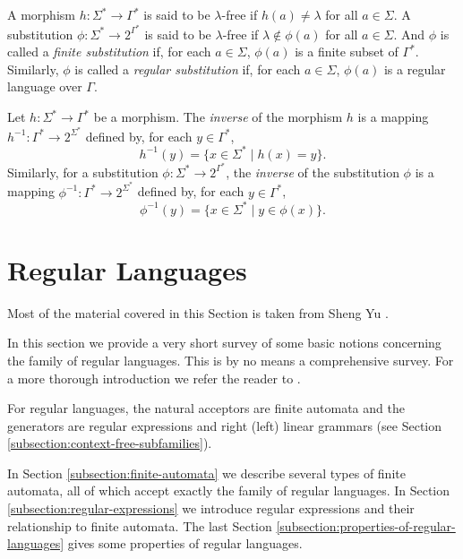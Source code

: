 A morphism $h: \Sigma^* \to \Gamma^*$ is said to be $\lambda$-free if $h(a) \neq \lambda$ for all $a \in \Sigma$. A substitution $\phi: \Sigma^* \to 2^{\Gamma^*}$ is said to be $\lambda$-free if $\lambda \notin \phi(a)$ for all $a \in \Sigma$. And $\phi$ is called a  \emph{finite substitution} if, for each $a \in \Sigma$, $\phi(a)$ is a finite subset of $\Gamma^*$. Similarly, $\phi$ is called a  \emph{regular substitution} if, for each $a \in \Sigma$, $\phi(a)$ is a regular language over $\Gamma$.

Let $h: \Sigma^* \to \Gamma^*$ be a morphism. The  \emph{inverse} of the morphism $h$ is a mapping $h^{-1}: \Gamma^* \to 2^{\Sigma^*}$ defined by, for each $y \in \Gamma^*$, $$h^{-1}(y) = \{x \in \Sigma^* \mid h(x) = y\}.$$ Similarly, for a substitution $\phi: \Sigma^* \to 2^{\Gamma^*}$, the \emph{inverse} of the substitution $\phi$ is a mapping $\phi^{-1}: \Gamma^* \to 2^{\Sigma^*}$ defined by, for each $y \in \Gamma^*$, $$\phi^{-1}(y) = \{x \in \Sigma^* \mid y \in \phi(x)\}.$$

\section{Regular Languages}
\label{section:regular-languages}

Most of the material covered in this Section is taken from Sheng Yu \cite{Sh1997regular}.

In this section we provide a very short survey of some basic notions concerning the family of regular languages. This is by no means a comprehensive survey. For a more thorough introduction we refer the reader to \cite{HopcroftMotwaniUllman07}.

For  regular languages, the natural acceptors are finite automata and the generators are regular expressions and right (left) linear grammars (see Section \ref{subsection:context-free-subfamilies}).

In Section \ref{subsection:finite-automata} we describe several types of finite automata, all of which accept exactly the family of regular languages. In Section \ref{subsection:regular-expressions} we introduce regular expressions and their relationship to finite automata. The last Section \ref{subsection:properties-of-regular-languages} gives some properties of regular languages.

